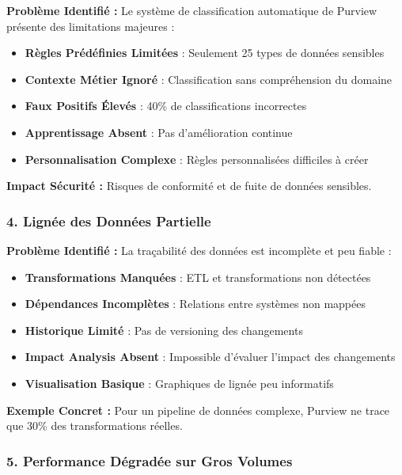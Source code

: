 \documentclass[12pt,a4paper]{article}
\begin{document}
\textbf{Problème Identifié :} Le système de classification automatique de Purview présente des limitations majeures :

\begin{itemize}
    \item \textbf{Règles Prédéfinies Limitées} : Seulement 25 types de données sensibles
    \item \textbf{Contexte Métier Ignoré} : Classification sans compréhension du domaine
    \item \textbf{Faux Positifs Élevés} : 40\% de classifications incorrectes
    \item \textbf{Apprentissage Absent} : Pas d'amélioration continue
    \item \textbf{Personnalisation Complexe} : Règles personnalisées difficiles à créer
\end{itemize}

\textbf{Impact Sécurité :} Risques de conformité et de fuite de données sensibles.

\subsubsection{4. Lignée des Données Partielle}

\textbf{Problème Identifié :} La traçabilité des données est incomplète et peu fiable :

\begin{itemize}
    \item \textbf{Transformations Manquées} : ETL et transformations non détectées
    \item \textbf{Dépendances Incomplètes} : Relations entre systèmes non mappées
    \item \textbf{Historique Limité} : Pas de versioning des changements
    \item \textbf{Impact Analysis Absent} : Impossible d'évaluer l'impact des changements
    \item \textbf{Visualisation Basique} : Graphiques de lignée peu informatifs
\end{itemize}

\textbf{Exemple Concret :} Pour un pipeline de données complexe, Purview ne trace que 30\% des transformations réelles.

\subsubsection{5. Performance Dégradée sur Gros Volumes}
\end{document}
